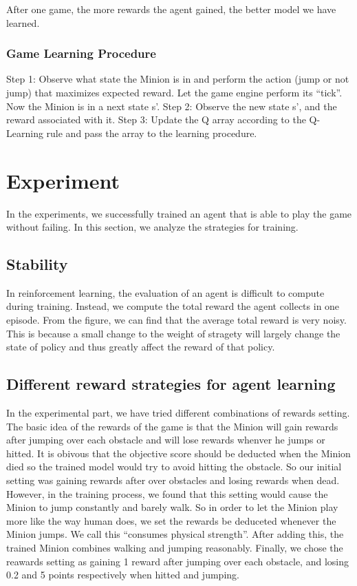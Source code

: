 \documentclass{acmsiggraph}
\begin{document}
After one game, the more rewards the agent gained, the better model we have learned.

\subsubsection{Game Learning Procedure}

Step 1: Observe what state the Minion is in and perform the action (jump or not jump) that maximizes expected reward. Let the game engine perform its “tick”. Now the Minion is in a next state s’.
Step 2: Observe the new state s’, and the reward associated with it.
Step 3: Update the Q array according to the Q-Learning rule and pass the array to the learning procedure.


\section{Experiment}
In the experiments, we successfully trained an agent that is able to play the game without failing. In this section, we analyze the strategies for training.

\subsection{Stability}
In reinforcement learning, the evaluation of an agent is difficult to compute during training. Instead, we compute the total reward the agent collects in one episode. From the figure, we can find that the average total reward is very noisy. This is because a small change to the weight of stragety will largely change the state of policy and thus greatly affect the reward of that policy. 

\subsection{Different reward strategies for agent learning}
In the experimental part, we have tried different combinations of rewards setting. The basic idea of the rewards of the game is that the Minion will gain rewards after jumping over each obstacle and will lose rewards whenver he jumps or hitted. It is obivous that the objective score should be deducted when the Minion died so the trained model would try to avoid hitting the obstacle. So our initial setting was gaining rewards after over obstacles and losing rewards when dead. However, in the training process, we found that this setting would cause the Minion to jump constantly and barely walk. So in order to let the Minion play more like the way human does, we set the rewards be deduceted whenever the Minion jumps. We call this “consumes physical strength”. After adding this, the trained Minion combines walking and jumping reasonably. Finally, we chose the reawards setting as gaining 1 reward after jumping over each obstacle, and losing 0.2 and 5 points respectively when hitted and jumping. 
\end{document}
